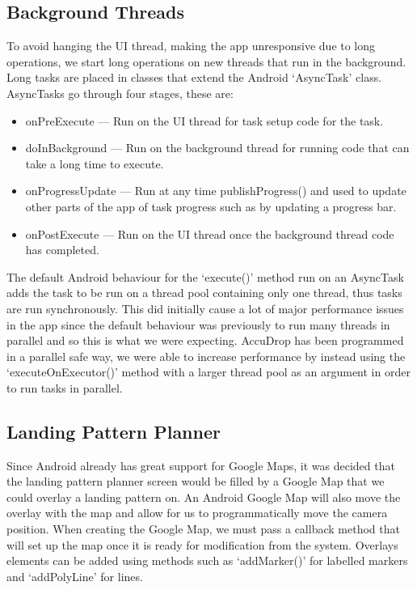 \subsection{Background Threads}
To avoid hanging the UI thread, making the app unresponsive due to long operations, we start long operations on new threads that run in the background. Long tasks are placed in classes that extend the Android `AsyncTask' class. AsyncTasks go through four stages, these are:
\begin{itemize}
  \item onPreExecute --- Run on the UI thread for task setup code for the task.
  \item doInBackground --- Run on the background thread for running code that can take a long time to execute.
  \item onProgressUpdate --- Run at any time publishProgress() and used to update other parts of the app of task progress such as by updating a progress bar.
  \item onPostExecute --- Run on the UI thread once the background thread code has completed.
\end{itemize}

The default Android behaviour for the `execute()' method run on an AsyncTask adds the task to be run on a thread pool containing only one thread, thus tasks are run synchronously. This did initially cause a lot of major performance issues in the app since the default behaviour was previously to run many threads in parallel and so this is what we were expecting. AccuDrop has been programmed in a parallel safe way, we were able to increase performance by instead using the `executeOnExecutor()' method with a larger thread pool as an argument in order to run tasks in parallel.

\subsection{Landing Pattern Planner}
Since Android already has great support for Google Maps, it was decided that the landing pattern planner screen would be filled by a Google Map that we could overlay a landing pattern on. An Android Google Map will also move the overlay with the map and allow for us to programmatically move the camera position.
When creating the Google Map, we must pass a callback method that will set up the map once it is ready for modification from the system. Overlays elements can be added using methods such as `addMarker()' for labelled markers and `addPolyLine' for lines.

